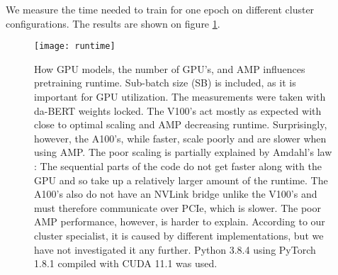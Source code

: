 \documentclass[main.tex]{subfiles}
\begin{document}
We measure the time needed to train for one epoch on different cluster configurations.
The results are shown on figure \ref{fig:runtime}.
\begin{figure}[H]
    \centering
    \texttt{[image: runtime]}
    \caption{
        How GPU models, the number of GPU's, and AMP influences pretraining runtime.
        Sub-batch size (SB) is included, as it is important for GPU utilization.
        The measurements were taken with da-BERT weights locked.
        The V100's act mostly as expected with close to optimal scaling and AMP decreasing runtime.
        Surprisingly, however, the A100's, while faster, scale poorly and are slower when using AMP.
        The poor scaling is partially explained by Amdahl's law \cite{klein2011amdahl}: The sequential parts of the code do not get faster along with the GPU and so take up a relatively larger amount of the runtime.
        The A100's also do not have an NVLink bridge unlike the V100's and must therefore communicate over PCIe, which is slower.
        The poor AMP performance, however, is harder to explain.
        According to our cluster specialist, it is caused by different  implementations, but we have not investigated it any further.
        Python 3.8.4 using PyTorch 1.8.1 compiled with CUDA 11.1 was used.
    }
    \label{fig:runtime}
\end{figure}\noindent
\end{document}

